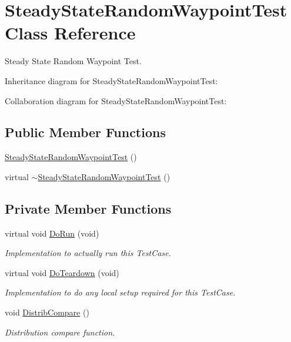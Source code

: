 \hypertarget{classSteadyStateRandomWaypointTest}{}\section{Steady\+State\+Random\+Waypoint\+Test Class Reference}
\label{classSteadyStateRandomWaypointTest}


Steady State Random Waypoint Test.  




Inheritance diagram for Steady\+State\+Random\+Waypoint\+Test\+:


Collaboration diagram for Steady\+State\+Random\+Waypoint\+Test\+:
\subsection*{Public Member Functions}
\begin{DoxyCompactItemize}
\item 
\hyperlink{classSteadyStateRandomWaypointTest_a7bb790ee4869b61800112dd29396fd89}{Steady\+State\+Random\+Waypoint\+Test} ()
\item 
virtual \hyperlink{classSteadyStateRandomWaypointTest_a63a9bd135cc5fa38ce649ffa5a232351}{$\sim$\+Steady\+State\+Random\+Waypoint\+Test} ()
\end{DoxyCompactItemize}
\subsection*{Private Member Functions}
\begin{DoxyCompactItemize}
\item 
virtual void \hyperlink{classSteadyStateRandomWaypointTest_a06b559358eab241daa3a937a038729df}{Do\+Run} (void)
\begin{DoxyCompactList}\small\item\em Implementation to actually run this Test\+Case. \end{DoxyCompactList}\item 
virtual void \hyperlink{classSteadyStateRandomWaypointTest_afc0a9be711bf8100bcf66a56b79caef4}{Do\+Teardown} (void)
\begin{DoxyCompactList}\small\item\em Implementation to do any local setup required for this Test\+Case. \end{DoxyCompactList}\item 
void \hyperlink{classSteadyStateRandomWaypointTest_a7fec88fc2579b3c0601a8704e04584d3}{Distrib\+Compare} ()
\begin{DoxyCompactList}\small\item\em Distribution compare function. \end{DoxyCompactList}\end{DoxyCompactItemize}
